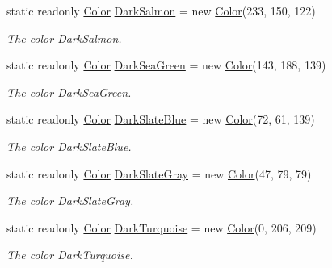 \begin{DoxyCompactItemize}
static readonly \hyperlink{struct_tri_devs_1_1_tri_engine2_d_1_1_color}{Color} \hyperlink{struct_tri_devs_1_1_tri_engine2_d_1_1_color_aeb469a9cc10d291d91b305229df2f5b1}{Dark\-Salmon} = new \hyperlink{struct_tri_devs_1_1_tri_engine2_d_1_1_color}{Color}(233, 150, 122)
\begin{DoxyCompactList}\small\item\em The color Dark\-Salmon. \end{DoxyCompactList}\item 
static readonly \hyperlink{struct_tri_devs_1_1_tri_engine2_d_1_1_color}{Color} \hyperlink{struct_tri_devs_1_1_tri_engine2_d_1_1_color_a8c13de23b87138591e56c8432d10fee5}{Dark\-Sea\-Green} = new \hyperlink{struct_tri_devs_1_1_tri_engine2_d_1_1_color}{Color}(143, 188, 139)
\begin{DoxyCompactList}\small\item\em The color Dark\-Sea\-Green. \end{DoxyCompactList}\item 
static readonly \hyperlink{struct_tri_devs_1_1_tri_engine2_d_1_1_color}{Color} \hyperlink{struct_tri_devs_1_1_tri_engine2_d_1_1_color_a7f02422c2aed4a2127e7cbc30a3549ef}{Dark\-Slate\-Blue} = new \hyperlink{struct_tri_devs_1_1_tri_engine2_d_1_1_color}{Color}(72, 61, 139)
\begin{DoxyCompactList}\small\item\em The color Dark\-Slate\-Blue. \end{DoxyCompactList}\item 
static readonly \hyperlink{struct_tri_devs_1_1_tri_engine2_d_1_1_color}{Color} \hyperlink{struct_tri_devs_1_1_tri_engine2_d_1_1_color_ac2994eaae8f3988f184a87a2f1e8feaa}{Dark\-Slate\-Gray} = new \hyperlink{struct_tri_devs_1_1_tri_engine2_d_1_1_color}{Color}(47, 79, 79)
\begin{DoxyCompactList}\small\item\em The color Dark\-Slate\-Gray. \end{DoxyCompactList}\item 
static readonly \hyperlink{struct_tri_devs_1_1_tri_engine2_d_1_1_color}{Color} \hyperlink{struct_tri_devs_1_1_tri_engine2_d_1_1_color_a44e6e2ed59740a79d52fdcfb3ca52178}{Dark\-Turquoise} = new \hyperlink{struct_tri_devs_1_1_tri_engine2_d_1_1_color}{Color}(0, 206, 209)
\begin{DoxyCompactList}\small\item\em The color Dark\-Turquoise. \end{DoxyCompactList}\item 

\end{DoxyCompactItemize}
